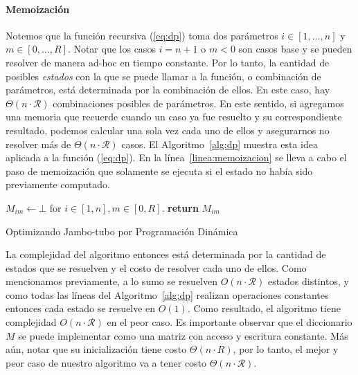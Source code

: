 \documentclass{article}
\newcommand{\Res}{\mathcal{R}}
\begin{document}
\paragraph{Memoización}
Notemos que la función recursiva (\ref{eq:dp}) toma dos parámetros $i \in [1, \hdots, n]$ y $m \in [0, \hdots, R]$. Notar que los casos $i = n+1$ o $m < 0$ son casos base y se pueden resolver de manera ad-hoc en tiempo constante. Por lo tanto, la cantidad de posibles \emph{estados} con la que se puede llamar a la función, o combinación de parámetros, está determinada por la combinación de ellos. En este caso, hay $\Theta(n \cdot \Res)$ combinaciones posibles de parámetros. En este sentido, si agregamos una memoria que recuerde cuando un caso ya fue resuelto y su correspondiente resultado, podemos calcular una sola vez cada uno de ellos y asegurarnos no resolver más de $\Theta(n \cdot \Res)$ casos. El Algoritmo~\ref{alg:dp} muestra esta idea aplicada a la función (\ref{eq:dp}). En la línea~\ref{linea:memoizacion} se lleva a cabo el paso de memoización que solamente se ejecuta si el estado no había sido previamente computado.

\begin{algorithm}
\begin{algorithmic}[1]
\State $M_{im} \gets \bot$ for $i \in [1, n], m \in [0, R]$.
         \label{linea:memoizacion}
    \EndIf
    \State \textbf{return} $M_{im}$
\EndFunction
\end{algorithmic}
\caption{Optimizando Jambo-tubo por Programación Dinámica}
\label{alg:dp}
\end{algorithm}

La complejidad del algoritmo entonces está determinada por la cantidad de estados que se resuelven y el costo de resolver cada uno de ellos. Como mencionamos previamente, a lo sumo se resuelven $O(n \cdot \Res)$ estados distintos, y como todas las líneas del Algoritmo~\ref{alg:dp} realizan operaciones constantes entonces cada estado se resuelve en $O(1)$. Como resultado, el algoritmo tiene complejidad $O(n \cdot \Res)$ en el peor caso. Es importante observar que el diccionario $M$ se puede implementar como una matriz con acceso y escritura constante. Más aún, notar que su inicialización tiene costo $\Theta(n \cdot R)$, por lo tanto, el mejor y peor caso de nuestro algoritmo va a tener costo $\Theta(n \cdot \Res)$.
\end{document}
